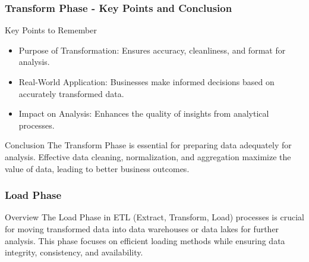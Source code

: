 \documentclass[aspectratio=169]{beamer}
\begin{document}
\begin{frame}[fragile]
    \frametitle{Transform Phase - Key Points and Conclusion}
    \begin{block}{Key Points to Remember}
        \begin{itemize}
            \item Purpose of Transformation: Ensures accuracy, cleanliness, and format for analysis.
            \item Real-World Application: Businesses make informed decisions based on accurately transformed data.
            \item Impact on Analysis: Enhances the quality of insights from analytical processes.
        \end{itemize}
    \end{block}

    \begin{block}{Conclusion}
        The Transform Phase is essential for preparing data adequately for analysis. Effective data cleaning, normalization, and aggregation maximize the value of data, leading to better business outcomes.
    \end{block}
\end{frame}

\begin{frame}[fragile]
    \frametitle{Load Phase}
    \begin{block}{Overview}
        The Load Phase in ETL (Extract, Transform, Load) processes is crucial for moving transformed data into data warehouses or data lakes for further analysis. This phase focuses on efficient loading methods while ensuring data integrity, consistency, and availability.
    \end{block}
\end{frame}
\end{document}
